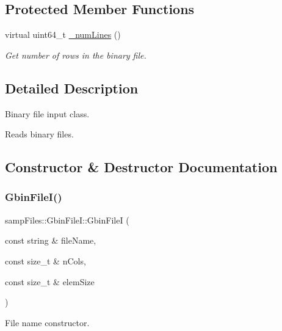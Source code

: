 \subsection*{Protected Member Functions}
\begin{DoxyCompactItemize}
\item 
virtual uint64\+\_\+t \hyperlink{classsamp_files_1_1_gbin_file_i_a3d972257dc42d62b6c623abc591f75f0}{\+\_\+num\+Lines} ()
\begin{DoxyCompactList}\small\item\em Get number of rows in the binary file. \end{DoxyCompactList}\end{DoxyCompactItemize}


\subsection{Detailed Description}
Binary file input class. 

Reads binary files. 

\subsection{Constructor \& Destructor Documentation}
\mbox{\label{classsamp_files_1_1_gbin_file_i_ac77637d71f66c575de57443d9220984a}} 
\subsubsection{\texorpdfstring{Gbin\+File\+I()}{GbinFileI()}}
{\footnotesize\ttfamily samp\+Files\+::\+Gbin\+File\+I\+::\+Gbin\+FileI (\begin{DoxyParamCaption}\item[{const string \&}]{file\+Name,  }\item[{const size\+\_\+t \&}]{n\+Cols,  }\item[{const size\+\_\+t \&}]{elem\+Size }\end{DoxyParamCaption})\hspace{0.3cm}{\ttfamily [inline]}}



File name constructor. 


